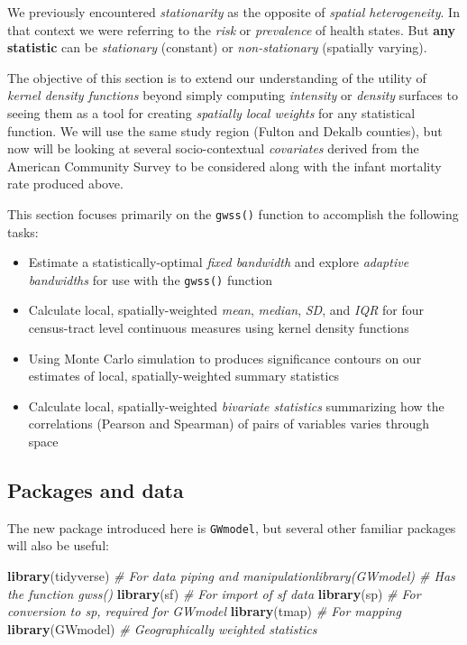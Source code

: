 \documentclass[
]{book}
\newenvironment{Shaded}{\begin{snugshade}}{\end{snugshade}}
\newcommand{\CommentTok}[1]{\textcolor[rgb]{0.56,0.35,0.01}{\textit{#1}}}
\newcommand{\FunctionTok}[1]{\textcolor[rgb]{0.13,0.29,0.53}{\textbf{#1}}}
\newcommand{\NormalTok}[1]{#1}
\providecommand{\tightlist}{%
  \setlength{\itemsep}{0pt}\setlength{\parskip}{0pt}}
\begin{document}
We previously encountered \emph{stationarity} as the opposite of \emph{spatial heterogeneity}. In that context we were referring to the \emph{risk} or \emph{prevalence} of health states. But \textbf{any statistic} can be \emph{stationary} (constant) or \emph{non-stationary} (spatially varying).

The objective of this section is to extend our understanding of the utility of \emph{kernel density functions} beyond simply computing \emph{intensity} or \emph{density} surfaces to seeing them as a tool for creating \emph{spatially local weights} for any statistical function. We will use the same study region (Fulton and Dekalb counties), but now will be looking at several socio-contextual \emph{covariates} derived from the American Community Survey to be considered along with the infant mortality rate produced above.

This section focuses primarily on the \texttt{gwss()} function to accomplish the following tasks:

\begin{itemize}
\tightlist
\item
  Estimate a statistically-optimal \emph{fixed bandwidth} and explore \emph{adaptive bandwidths} for use with the \texttt{gwss()} function
\item
  Calculate local, spatially-weighted \emph{mean}, \emph{median}, \emph{SD}, and \emph{IQR} for four census-tract level continuous measures using kernel density functions
\item
  Using Monte Carlo simulation to produces significance contours on our estimates of local, spatially-weighted summary statistics
\item
  Calculate local, spatially-weighted \emph{bivariate statistics} summarizing how the correlations (Pearson and Spearman) of pairs of variables varies through space
\end{itemize}

\hypertarget{packages-and-data}{%
\subsection{Packages and data}\label{packages-and-data}}

The new package introduced here is \texttt{GWmodel}, but several other familiar packages will also be useful:

\begin{Shaded}
\begin{Highlighting}[]
\FunctionTok{library}\NormalTok{(tidyverse) }\CommentTok{\# For data piping and manipulationlibrary(GWmodel)   \# Has the function gwss() }
\FunctionTok{library}\NormalTok{(sf)        }\CommentTok{\# For import of sf data}
\FunctionTok{library}\NormalTok{(sp)        }\CommentTok{\# For conversion to sp, required for GWmodel}
\FunctionTok{library}\NormalTok{(tmap)      }\CommentTok{\# For mapping}
\FunctionTok{library}\NormalTok{(GWmodel)   }\CommentTok{\# Geographically weighted statistics}
\end{Highlighting}
\end{Shaded}
\end{document}
